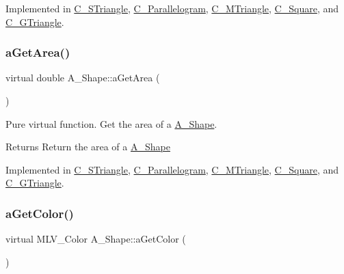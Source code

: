 Implemented in \hyperlink{classC__STriangle_a38304830925938339c4a4a0ad812e151}{C\+\_\+\+S\+Triangle}, \hyperlink{classC__Parallelogram_a51959da2b0cf083767f39d8065f395f2}{C\+\_\+\+Parallelogram}, \hyperlink{classC__MTriangle_aad1e42f1ec9c486736a403128ba47179}{C\+\_\+\+M\+Triangle}, \hyperlink{classC__Square_ac7779503b305fda4147b735622c66f81}{C\+\_\+\+Square}, and \hyperlink{classC__GTriangle_a98866648972bb78707c61aa7ebc22fb9}{C\+\_\+\+G\+Triangle}.

\mbox{\label{classA__Shape_a1b142ee2d873d6c217f65de1632e7b6e}} 
\subsubsection{\texorpdfstring{a\+Get\+Area()}{aGetArea()}}
{\footnotesize\ttfamily virtual double A\+\_\+\+Shape\+::a\+Get\+Area (\begin{DoxyParamCaption}{ }\end{DoxyParamCaption})\hspace{0.3cm}{\ttfamily [pure virtual]}}



Pure virtual function. Get the area of a \hyperlink{classA__Shape}{A\+\_\+\+Shape}. 

\begin{DoxyReturn}{Returns}
Return the area of a \hyperlink{classA__Shape}{A\+\_\+\+Shape} 
\end{DoxyReturn}


Implemented in \hyperlink{classC__STriangle_aaff25f3c7f7640c3e7c735a77800e96e}{C\+\_\+\+S\+Triangle}, \hyperlink{classC__Parallelogram_a72b4509a33ee27331e5b9bdc8a3278e8}{C\+\_\+\+Parallelogram}, \hyperlink{classC__MTriangle_a1baff5085fc1b9822987e3fc307550ce}{C\+\_\+\+M\+Triangle}, \hyperlink{classC__Square_affd2be59872618d5d1955be360fb73e6}{C\+\_\+\+Square}, and \hyperlink{classC__GTriangle_a4d1c9a050aef86a7eab973b1fe668544}{C\+\_\+\+G\+Triangle}.

\mbox{\label{classA__Shape_a1e90c8132d33e4ac84d42f72606193b2}} 
\subsubsection{\texorpdfstring{a\+Get\+Color()}{aGetColor()}}
{\footnotesize\ttfamily virtual M\+L\+V\+\_\+\+Color A\+\_\+\+Shape\+::a\+Get\+Color (\begin{DoxyParamCaption}{ }\end{DoxyParamCaption})\hspace{0.3cm}{\ttfamily [pure virtual]}}



